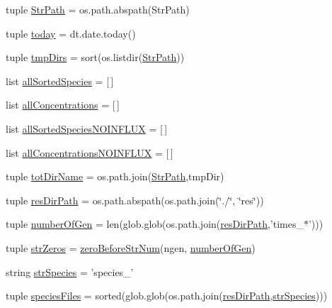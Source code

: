 \begin{DoxyCompactItemize}
\item 
tuple \hyperlink{a00090_a60fb7d39ab8835d4b764461220e796e2}{Str\-Path} = os.\-path.\-abspath(Str\-Path)
\item 
tuple \hyperlink{a00090_a71bc5e3d205016fb7893b438e75be78e}{today} = dt.\-date.\-today()
\item 
tuple \hyperlink{a00090_ac88c3245a42ebefee3fcf90626f6eaf4}{tmp\-Dirs} = sort(os.\-listdir(\hyperlink{a00090_a60fb7d39ab8835d4b764461220e796e2}{Str\-Path}))
\item 
list \hyperlink{a00090_aafc595063b7c4b74f94c0931ff2370a5}{all\-Sorted\-Species} = \mbox{[}$\,$\mbox{]}
\item 
list \hyperlink{a00090_ae708f0b0e671f432735f039e1ff6b6ca}{all\-Concentrations} = \mbox{[}$\,$\mbox{]}
\item 
list \hyperlink{a00090_a02a8db664a67956bc698b79f7c31a7bd}{all\-Sorted\-Species\-N\-O\-I\-N\-F\-L\-U\-X} = \mbox{[}$\,$\mbox{]}
\item 
list \hyperlink{a00090_acda16f4751633455ab19e92bdc5baf2a}{all\-Concentrations\-N\-O\-I\-N\-F\-L\-U\-X} = \mbox{[}$\,$\mbox{]}
\item 
tuple \hyperlink{a00090_ad3caf9c42727aaab24f4ea4dae362fc9}{tot\-Dir\-Name} = os.\-path.\-join(\hyperlink{a00090_a60fb7d39ab8835d4b764461220e796e2}{Str\-Path},tmp\-Dir)
\item 
tuple \hyperlink{a00090_a35eb3b681c7408f1476b92798d4f2c16}{res\-Dir\-Path} = os.\-path.\-abspath(os.\-path.\-join(\char`\"{}./\char`\"{}, \char`\"{}res\char`\"{}))
\item 
tuple \hyperlink{a00090_ac014a9b46a060e4fed96eaee9614345b}{number\-Of\-Gen} = len(glob.\-glob(os.\-path.\-join(\hyperlink{a00090_a35eb3b681c7408f1476b92798d4f2c16}{res\-Dir\-Path},'times\-\_\-$\ast$')))
\item 
tuple \hyperlink{a00090_a5708d1d44920d75a918ec1c988c02c57}{str\-Zeros} = \hyperlink{a00090_a97aba03091fd66dde4375e3dbffdbede}{zero\-Before\-Str\-Num}(ngen, \hyperlink{a00090_ac014a9b46a060e4fed96eaee9614345b}{number\-Of\-Gen})
\item 
string \hyperlink{a00090_aa76707ba3058ba96fc8e5aeafa461193}{str\-Species} = 'species\-\_\-'
\item 
tuple \hyperlink{a00090_a670249d163388a9d93c8f3b9fb63afac}{species\-Files} = sorted(glob.\-glob(os.\-path.\-join(\hyperlink{a00090_a35eb3b681c7408f1476b92798d4f2c16}{res\-Dir\-Path},\hyperlink{a00090_aa76707ba3058ba96fc8e5aeafa461193}{str\-Species})))
\item 

\end{DoxyCompactItemize}
